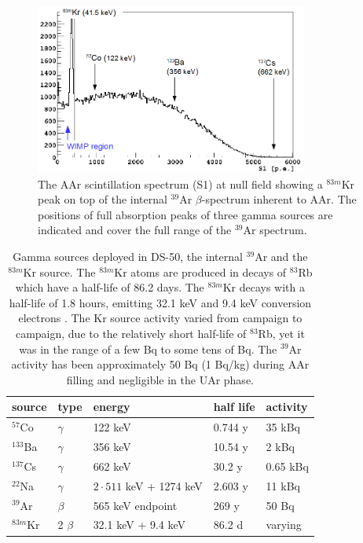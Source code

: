 \begin{figure}[htbp]
 \centering
 \includegraphics[width=0.8\textwidth]{Figures/GammaSources_Ar39spectrum.png}
 \caption{The AAr scintillation spectrum (S1) at null field showing a $^{83m}$Kr peak on top of the internal $^{39}$Ar $\beta$-spectrum inherent to AAr. The positions of full absorption peaks of three gamma sources are indicated and cover the full range of the $^{39}$Ar spectrum.
\label{fig:GammaSources_Ar39spectrum}}
\end{figure}

\begin{table}[htbp]
\centering
\caption{Gamma sources deployed in DS-50, the internal $^{39}$Ar and the $^{83m}$Kr source. The $^{83m}$Kr atoms are produced in decays of $^{83}$Rb which have a half-life of 86.2 days. The $^{83m}$Kr decays with a half-life of 1.8 hours, emitting 32.1 keV and 9.4 keV conversion electrons \cite{Lippincott:2010jb}. The Kr source activity varied from campaign to campaign, due to the relatively short half-life of $^{83}$Rb, yet it was in the range of a few Bq to some tens of Bq. The $^{39}$Ar activity has been approximately 50 Bq (1 Bq/kg) during AAr filling and negligible in the UAr phase.} %
\centering
\begin{tabular}{|l|l|l|l|l|}
\hline
\textbf{source} & \textbf{type} & \textbf{energy} & \textbf{half life} & \textbf{activity} \\ \hline
$^{57}$Co & $\gamma$ & 122 keV & 0.744 y  & 35 kBq \\ \hline
$^{133}$Ba & $\gamma$ & 356 keV & 10.54 y & 2 kBq \\ \hline
$^{137}$Cs & $\gamma$ & 662 keV & 30.2 y & 0.65 kBq \\ \hline
$^{22}$Na & $\gamma$ & $2\cdot 511$ keV + 1274 keV & 2.603 y & 11 kBq \\ \hline\hline
$^{39}$Ar & $\beta$ &  565 keV endpoint& 269 y  & 50 Bq\\ \hline
$^{83m}$Kr & 2 $\beta$ &  32.1 keV + 9.4 keV & 86.2 d & varying\\ \hline
\end{tabular}
\label{tbl:GammaSources}
\end{table}


